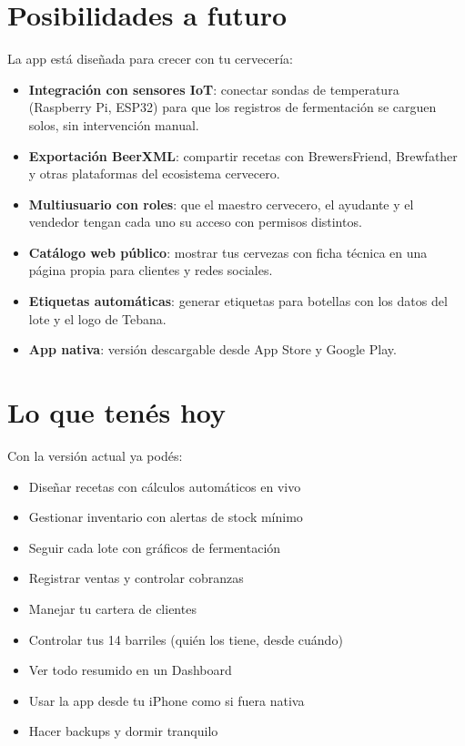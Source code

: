 \documentclass[11pt,a4paper]{report}
\begin{document}
\section{Posibilidades a futuro}

La app está diseñada para crecer con tu cervecería:

\begin{itemize}[leftmargin=*, itemsep=4pt]
  \item \textbf{Integración con sensores IoT}: conectar sondas de temperatura (Raspberry Pi, ESP32) para que los registros de fermentación se carguen solos, sin intervención manual.
  \item \textbf{Exportación BeerXML}: compartir recetas con BrewersFriend, Brewfather y otras plataformas del ecosistema cervecero.
  \item \textbf{Multiusuario con roles}: que el maestro cervecero, el ayudante y el vendedor tengan cada uno su acceso con permisos distintos.
  \item \textbf{Catálogo web público}: mostrar tus cervezas con ficha técnica en una página propia para clientes y redes sociales.
  \item \textbf{Etiquetas automáticas}: generar etiquetas para botellas con los datos del lote y el logo de Tebana.
  \item \textbf{App nativa}: versión descargable desde App Store y Google Play.
\end{itemize}

\section{Lo que tenés hoy}

Con la versión actual ya podés:

\begin{itemize}[leftmargin=*, itemsep=3pt]
  \item Diseñar recetas con cálculos automáticos en vivo
  \item Gestionar inventario con alertas de stock mínimo
  \item Seguir cada lote con gráficos de fermentación
  \item Registrar ventas y controlar cobranzas
  \item Manejar tu cartera de clientes
  \item Controlar tus 14 barriles (quién los tiene, desde cuándo)
  \item Ver todo resumido en un Dashboard
  \item Usar la app desde tu iPhone como si fuera nativa
  \item Hacer backups y dormir tranquilo
\end{itemize}
\end{document}

